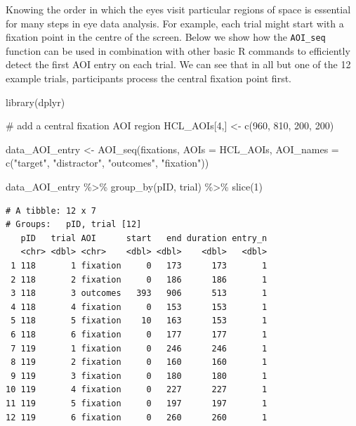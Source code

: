 \documentclass[
  man,
  floatsintext,
  longtable,
  nolmodern,
  notxfonts,
  notimes,
  colorlinks=true,linkcolor=blue,citecolor=blue,urlcolor=blue]{apa7}
\newenvironment{Shaded}{\begin{snugshade}}{\end{snugshade}}
\newcommand{\AttributeTok}[1]{\textcolor[rgb]{0.40,0.45,0.13}{#1}}
\newcommand{\CommentTok}[1]{\textcolor[rgb]{0.37,0.37,0.37}{#1}}
\newcommand{\DecValTok}[1]{\textcolor[rgb]{0.68,0.00,0.00}{#1}}
\newcommand{\FunctionTok}[1]{\textcolor[rgb]{0.28,0.35,0.67}{#1}}
\newcommand{\NormalTok}[1]{\textcolor[rgb]{0.00,0.23,0.31}{#1}}
\newcommand{\OtherTok}[1]{\textcolor[rgb]{0.00,0.23,0.31}{#1}}
\newcommand{\SpecialCharTok}[1]{\textcolor[rgb]{0.37,0.37,0.37}{#1}}
\newcommand{\StringTok}[1]{\textcolor[rgb]{0.13,0.47,0.30}{#1}}
\begin{document}
Knowing the order in which the eyes visit particular regions of space is
essential for many steps in eye data analysis. For example, each trial
might start with a fixation point in the centre of the screen. Below we
show how the \texttt{AOI\_seq} function can be used in combination with
other basic R commands to efficiently detect the first AOI entry on each
trial. We can see that in all but one of the 12 example trials,
participants process the central fixation point first.

\begin{Shaded}
\begin{Highlighting}[]
\FunctionTok{library}\NormalTok{(dplyr)}

\CommentTok{\# add a central fixation AOI region}
\NormalTok{HCL\_AOIs[}\DecValTok{4}\NormalTok{,] }\OtherTok{\textless{}{-}} \FunctionTok{c}\NormalTok{(}\DecValTok{960}\NormalTok{, }\DecValTok{810}\NormalTok{, }\DecValTok{200}\NormalTok{, }\DecValTok{200}\NormalTok{)}

\NormalTok{data\_AOI\_entry }\OtherTok{\textless{}{-}} 
  \FunctionTok{AOI\_seq}\NormalTok{(fixations, }
          \AttributeTok{AOIs =}\NormalTok{ HCL\_AOIs,}
          \AttributeTok{AOI\_names =} \FunctionTok{c}\NormalTok{(}\StringTok{"target"}\NormalTok{, }\StringTok{"distractor"}\NormalTok{, }\StringTok{"outcomes"}\NormalTok{, }\StringTok{"fixation"}\NormalTok{))}

\NormalTok{data\_AOI\_entry }\SpecialCharTok{\%\textgreater{}\%} 
  \FunctionTok{group\_by}\NormalTok{(pID, trial) }\SpecialCharTok{\%\textgreater{}\%} 
  \FunctionTok{slice}\NormalTok{(}\DecValTok{1}\NormalTok{)}
\end{Highlighting}
\end{Shaded}

\begin{verbatim}
# A tibble: 12 x 7
# Groups:   pID, trial [12]
   pID   trial AOI      start   end duration entry_n
   <chr> <dbl> <chr>    <dbl> <dbl>    <dbl>   <dbl>
 1 118       1 fixation     0   173      173       1
 2 118       2 fixation     0   186      186       1
 3 118       3 outcomes   393   906      513       1
 4 118       4 fixation     0   153      153       1
 5 118       5 fixation    10   163      153       1
 6 118       6 fixation     0   177      177       1
 7 119       1 fixation     0   246      246       1
 8 119       2 fixation     0   160      160       1
 9 119       3 fixation     0   180      180       1
10 119       4 fixation     0   227      227       1
11 119       5 fixation     0   197      197       1
12 119       6 fixation     0   260      260       1
\end{verbatim}
\end{document}
